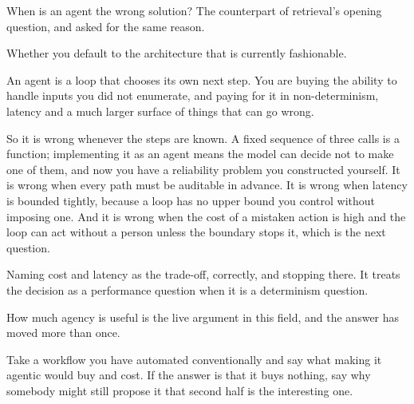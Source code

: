 \begin{bankq}{When is an agent the wrong solution?}
\qasked
The counterpart of retrieval's opening question, and asked for the same reason.

\qtested
Whether you default to the architecture that is currently fashionable.

\qstaff
An agent is a loop that chooses its own next step. You are buying the ability
to handle inputs you did not enumerate, and paying for it in non-determinism,
latency and a much larger surface of things that can go wrong.

So it is wrong whenever the steps are known. A fixed sequence of three calls is
a function; implementing it as an agent means the model can decide not to make
one of them, and now you have a reliability problem you constructed yourself.
It is wrong when every path must be auditable in advance. It is wrong when
latency is bounded tightly, because a loop has no upper bound you control
without imposing one. And it is wrong when the cost of a mistaken action is
high and the loop can act without a person \dash{} unless the boundary stops
it, which is the next question.


\qsenior
Naming cost and latency as the trade-off, correctly, and stopping there. It
treats the decision as a performance question when it is a determinism
question.

\qcontested
How much agency is useful is the live argument in this field, and the answer
has moved more than once. 

\qdrill
Take a workflow you have automated conventionally and say what making it
agentic would buy and cost. If the answer is that it buys nothing, say why
somebody might still propose it \dash{} that second half is the interesting one.
\end{bankq}

